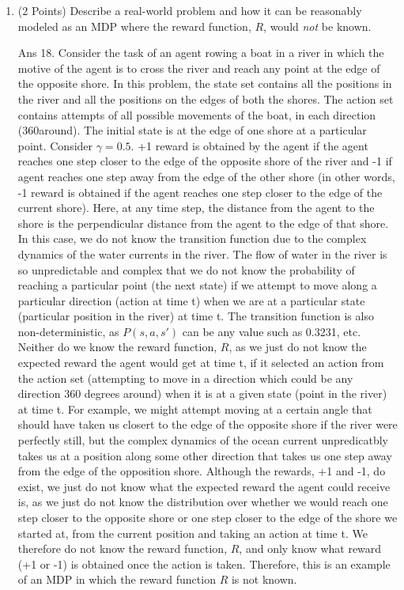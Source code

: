 \documentclass[]{article}
\begin{document}
\begin{enumerate}
    \item (2 Points) Describe a real-world problem and how it can be reasonably modeled as an MDP where the reward function, $R$, would \emph{not} be known. 

	{
		\color{blue}
			Ans 18. Consider the task of an agent rowing a boat in a river in which the motive of the agent is to cross the river and reach any point at the edge of the opposite shore. In this  problem, the state set contains all the positions in the river and all the positions on the edges of both the shores. The action set contains attempts of all possible movements of the boat, in each direction (360\degree around). The initial state is at the edge of one shore at a particular point. Consider $\gamma = 0.5$. +1 reward is obtained by the agent if the agent reaches one step closer to the edge of the opposite shore of the river and -1 if agent reaches one step away from the edge of the other shore (in other words, -1 reward is obtained if the agent reaches one step closer to the edge of the current shore). Here, at any time step, the distance from the agent to the shore is the perpendicular distance from the agent to the edge of that shore. In this case, we do not know the transition function due to the complex dynamics of the water currents in the river. The flow of water in the river is so unpredictable and complex  that we do not know the probability of reaching a particular point (the next state)  if we attempt to move along a particular direction (action at time t) when we are at a particular state (particular position in the river) at time t. The transition function is also non-deterministic, as $P(s, a, s')$ can be any value such as 0.3231, etc. Neither do we know the reward function, $R$, as we just do not know the expected reward the agent would get at time t, if it selected an action from the action set (attempting to move in a direction which could be any direction 360 degrees around) when it is at a given state (point in the river) at time t. For example, we might attempt moving at a certain angle that should have taken us closert to the edge of the opposite shore if the river were perfectly still, but the complex dynamics of the ocean current unpredicatbly takes us at a position along some other direction that takes us one step away from the edge of the opposition shore. Although the rewards, +1 and -1, do exist, we just do not know what the expected reward the agent could receive is, as we just do not know the distribution over whether we would reach one step closer to the opposite shore or one step closer to the edge of the shore we started at, from the current position and taking an action at time t. We therefore do not know the reward function, $R$, and only know what reward (+1 or -1) is obtained once the action is taken. Therefore, this is an example of an MDP in which the reward function $R$ is not known.
	}



\end{enumerate}
\end{document}
